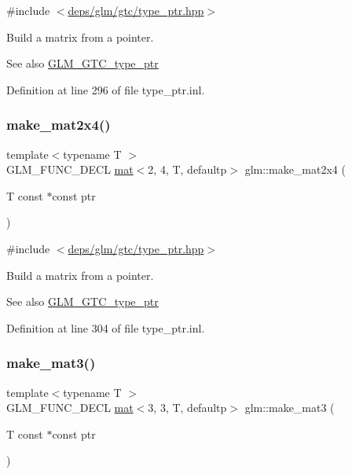 {\ttfamily \#include $<$\hyperlink{type__ptr_8hpp}{deps/glm/gtc/type\+\_\+ptr.\+hpp}$>$}

Build a matrix from a pointer. \begin{DoxySeeAlso}{See also}
\hyperlink{group__gtc__type__ptr}{G\+L\+M\+\_\+\+G\+T\+C\+\_\+type\+\_\+ptr} 
\end{DoxySeeAlso}


Definition at line 296 of file type\+\_\+ptr.\+inl.

\mbox{\label{group__gtc__type__ptr_ga078b862c90b0e9a79ed43a58997d8388}} 
\subsubsection{\texorpdfstring{make\+\_\+mat2x4()}{make\_mat2x4()}}
{\footnotesize\ttfamily template$<$typename T $>$ \\
G\+L\+M\+\_\+\+F\+U\+N\+C\+\_\+\+D\+E\+CL \hyperlink{structglm_1_1mat}{mat}$<$2, 4, T, defaultp$>$ glm\+::make\+\_\+mat2x4 (\begin{DoxyParamCaption}\item[{T const $\ast$const}]{ptr }\end{DoxyParamCaption})}



{\ttfamily \#include $<$\hyperlink{type__ptr_8hpp}{deps/glm/gtc/type\+\_\+ptr.\+hpp}$>$}

Build a matrix from a pointer. \begin{DoxySeeAlso}{See also}
\hyperlink{group__gtc__type__ptr}{G\+L\+M\+\_\+\+G\+T\+C\+\_\+type\+\_\+ptr} 
\end{DoxySeeAlso}


Definition at line 304 of file type\+\_\+ptr.\+inl.

\mbox{\label{group__gtc__type__ptr_ga611ee7c4d4cadfc83a8fa8e1d10a170f}} 
\subsubsection{\texorpdfstring{make\+\_\+mat3()}{make\_mat3()}}
{\footnotesize\ttfamily template$<$typename T $>$ \\
G\+L\+M\+\_\+\+F\+U\+N\+C\+\_\+\+D\+E\+CL \hyperlink{structglm_1_1mat}{mat}$<$3, 3, T, defaultp$>$ glm\+::make\+\_\+mat3 (\begin{DoxyParamCaption}\item[{T const $\ast$const}]{ptr }\end{DoxyParamCaption})}



